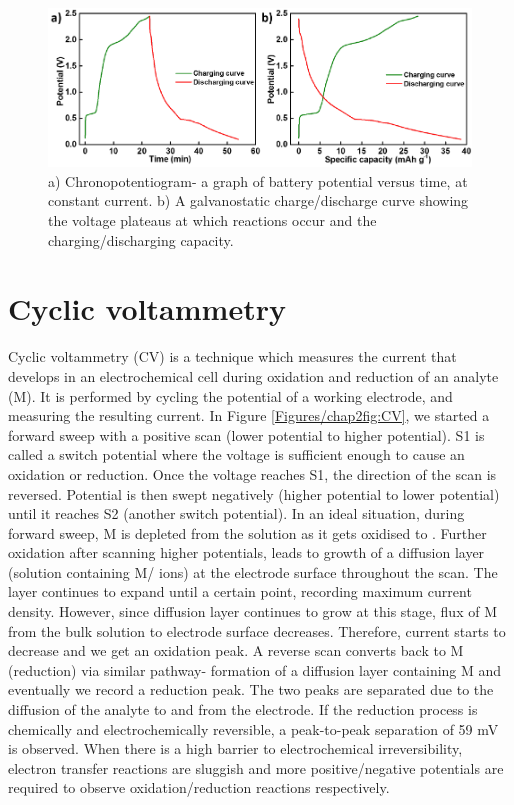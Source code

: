 \begin{figure}[th!]
\centering
\includegraphics[width=\textwidth]{Figures/chap2fig/ChrononCDC}
\caption{a) Chronopotentiogram- a graph of battery potential versus time, at constant current. b) A galvanostatic charge/discharge curve showing the voltage plateaus at which reactions occur and the charging/discharging capacity.}
\label{Figures/chap2fig:ChrononCDC}
\end{figure}

\section{Cyclic voltammetry}
Cyclic voltammetry (CV) is a technique which measures the current that develops in an electrochemical cell during oxidation and reduction of an analyte (M). It is performed by cycling the potential of a working electrode, and measuring the resulting current. In Figure \ref{Figures/chap2fig:CV}, we started a forward sweep with a positive scan (lower potential to higher potential). S1 is called a switch potential where the voltage is sufficient enough to cause an oxidation or reduction. Once the voltage reaches S1, the direction of the scan is reversed. Potential is then swept negatively (higher potential to lower potential) until it reaches S2 (another switch potential). In an ideal situation, during forward sweep, M is depleted from the solution as it gets oxidised to . Further oxidation after scanning higher potentials, leads to growth of a diffusion layer (solution containing M/ ions) at the electrode surface throughout the scan. The layer continues to expand until a certain point, recording maximum current density. However, since diffusion layer continues to grow at this stage, flux of M from the bulk solution to electrode surface decreases. Therefore, current starts to decrease and we get an oxidation peak. A reverse scan converts  back to M (reduction) via similar pathway- formation of a diffusion layer containing M and eventually we record a reduction peak. The two peaks are separated due to the diffusion of the analyte to and from the electrode. If the reduction process is chemically and electrochemically reversible, a peak-to-peak separation of 59 mV is observed. When there is a high barrier to electrochemical irreversibility, electron transfer reactions are sluggish and more positive/negative potentials are required to observe oxidation/reduction reactions respectively. 

